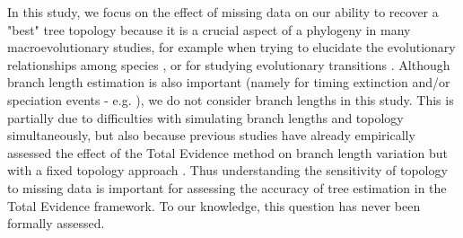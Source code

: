 \documentclass[12pt,letterpaper]{article}
\begin{document}
In this study, we focus on the effect of missing data on our ability to recover a "best" tree topology because it is a crucial aspect of a phylogeny in many macroevolutionary studies, for example when trying to elucidate the evolutionary relationships among species \citep[e.g.][]{meredithimpacts2011,jetzthe2012}, or for studying evolutionary transitions \citep[e.g.][]{friedmanexplosive2010}. Although branch length estimation is also important (namely for timing extinction and/or speciation events - e.g. \citealt{ronquista2012}), we do not consider branch lengths in this study. This is partially due to difficulties with simulating branch lengths and topology simultaneously, but also because previous studies have already empirically assessed the effect of the Total Evidence method on branch length variation but with a fixed topology approach \citep{ronquista2012,schragocombining2013,slaterphylogenetic2013,beckancient2014}. Thus understanding the sensitivity of topology to missing data is important for assessing the accuracy of tree estimation in the Total Evidence framework. To our knowledge, this question has never been formally assessed.
\end{document}
